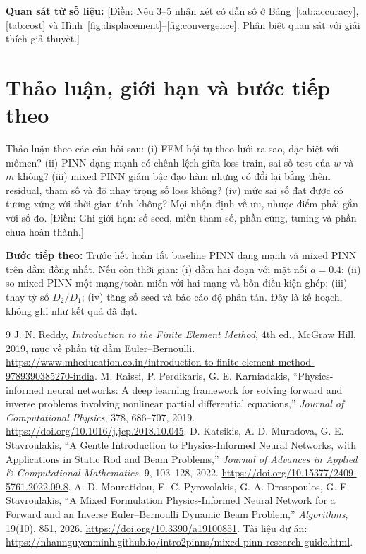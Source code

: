 \documentclass[12pt,a4paper]{article}
\newcommand{\todo}[1]{\textcolor{red!70!black}{[Điền: #1]}}
\begin{document}
\noindent\textbf{Quan sát từ số liệu:} \todo{Nêu 3--5 nhận xét có dẫn số ở Bảng~\ref{tab:accuracy}, \ref{tab:cost} và Hình~\ref{fig:displacement}--\ref{fig:convergence}. Phân biệt quan sát với giải thích giả thuyết.}

\section{Thảo luận, giới hạn và bước tiếp theo}
Thảo luận theo các câu hỏi sau: (i) FEM hội tụ theo lưới ra sao, đặc biệt với mômen? (ii) PINN dạng mạnh có chênh lệch giữa loss train, sai số test của $w$ và $m$ không? (iii) mixed PINN giảm bậc đạo hàm nhưng có đổi lại bằng thêm residual, tham số và độ nhạy trọng số loss không? (iv) mức sai số đạt được có tương xứng với thời gian tính không? Mọi nhận định về ưu, nhược điểm phải gắn với số đo. \todo{Ghi giới hạn: số seed, miền tham số, phần cứng, tuning và phần chưa hoàn thành.}

\textbf{Bước tiếp theo:} Trước hết hoàn tất baseline PINN dạng mạnh và mixed PINN trên dầm đồng nhất. Nếu còn thời gian: (i) dầm hai đoạn với mặt nối $a=0.4$; (ii) so mixed PINN một mạng/toàn miền với hai mạng và bốn điều kiện ghép; (iii) thay tỷ số $D_2/D_1$; (iv) tăng số seed và báo cáo độ phân tán. Đây là kế hoạch, không ghi như kết quả đã đạt.

\begin{thebibliography}{9}
 J. N. Reddy, \emph{Introduction to the Finite Element Method}, 4th ed., McGraw Hill, 2019, mục về phần tử dầm Euler--Bernoulli. \url{https://www.mheducation.co.in/introduction-to-finite-element-method-9789390385270-india}.
 M. Raissi, P. Perdikaris, G. E. Karniadakis, ``Physics-informed neural networks: A deep learning framework for solving forward and inverse problems involving nonlinear partial differential equations,'' \emph{Journal of Computational Physics}, 378, 686--707, 2019. \url{https://doi.org/10.1016/j.jcp.2018.10.045}.
 D. Katsikis, A. D. Muradova, G. E. Stavroulakis, ``A Gentle Introduction to Physics-Informed Neural Networks, with Applications in Static Rod and Beam Problems,'' \emph{Journal of Advances in Applied \& Computational Mathematics}, 9, 103--128, 2022. \url{https://doi.org/10.15377/2409-5761.2022.09.8}.
 A. D. Mouratidou, E. C. Pyrovolakis, G. A. Drosopoulos, G. E. Stavroulakis, ``A Mixed Formulation Physics-Informed Neural Network for a Forward and an Inverse Euler--Bernoulli Dynamic Beam Problem,'' \emph{Algorithms}, 19(10), 851, 2026. \url{https://doi.org/10.3390/a19100851}.
 Tài liệu dự án: \url{https://nhannguyenminh.github.io/intro2pinns/mixed-pinn-research-guide.html}.
\end{thebibliography}
\end{document}
